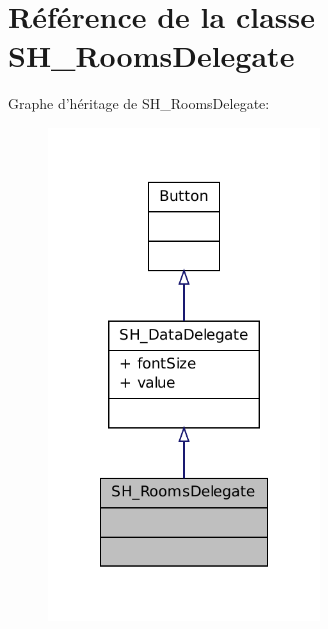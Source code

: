 \hypertarget{classSH__RoomsDelegate}{\section{Référence de la classe S\-H\-\_\-\-Rooms\-Delegate}
\label{classSH__RoomsDelegate}
}


Graphe d'héritage de S\-H\-\_\-\-Rooms\-Delegate\-:\nopagebreak
\begin{figure}[H]
\begin{center}
\leavevmode
\includegraphics[width=204pt]{classSH__RoomsDelegate__inherit__graph}
\end{center}
\end{figure}


